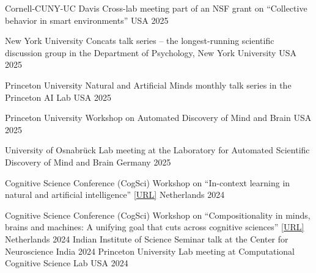 \begin{cvhonors}
    \cvhonor
    {Cornell-CUNY-UC Davis} %
    {Cross-lab meeting part of an NSF grant on “Collective behavior in smart environments”} 
    {USA} %
    {2025} %


    \cvhonor
    {New York University} %
    {Concats talk series -- the longest-running scientific discussion group in the Department of Psychology, New York University} 
    {USA} %
    {2025} %



    \cvhonor
    {Princeton University} %
    {Natural and Artificial Minds monthly talk series in the Princeton AI Lab} 
    {USA} %
    {2025} %


    \cvhonor
    {Princeton University} %
    {Workshop on Automated Discovery of Mind and Brain} 
    {USA} %
    {2025} %

    \cvhonor
    {University of Osnabrück} %
    {Lab meeting at the Laboratory for Automated Scientific Discovery of Mind and Brain} 
    {Germany} %
    {2025} %

    \cvhonor
    {Cognitive Science Conference (CogSci)} %
    {Workshop on “In-context learning in natural and artificial intelligence” \href{https://jacquespesnot.github.io/2024_CogSci_Workshop/}{[URL]}} 
    {Netherlands} %
    {2024} %

    \cvhonor
    {Cognitive Science Conference (CogSci)} %
    {Workshop on “Compositionality in minds, brains and machines: A unifying goal that cuts across cognitive sciences” \href{https://workshop-compositionality-cogsci-2024.info/}{[URL]}} 
    {Netherlands} %
    {2024} %
    \cvhonor
    {Indian Institute of Science} %
    {Seminar talk at the Center for Neuroscience} 
    {India} %
    {2024} %
    \cvhonor
    {Princeton University} %
    {Lab meeting at Computational Cognitive Science Lab} 
    {USA} %
    {2024} %


\end{cvhonors}
